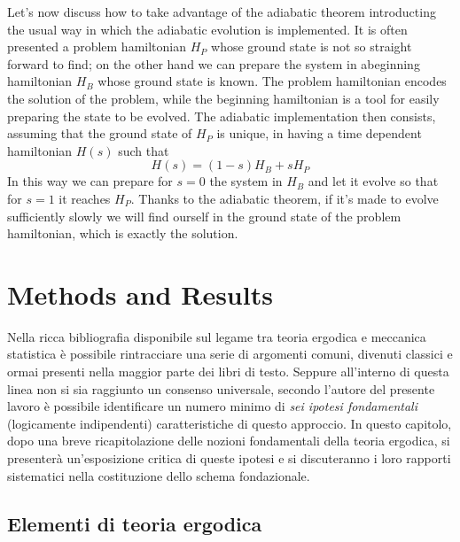 \documentclass[11pt, twoside]{report}
\begin{document}
Let's now discuss how to take advantage of the adiabatic theorem introducting the usual way in which the adiabatic evolution is implemented. It is often presented a problem hamiltonian $H_P$ whose ground state is not so straight forward to find; on the other hand we can prepare the system in abeginning hamiltonian $H_B$ whose ground state is known. The problem hamiltonian encodes the solution of the problem, while the beginning hamiltonian is a tool for easily preparing the state to be evolved. The adiabatic implementation then consists, assuming that the ground state of $H_P$ is unique, in having a time dependent hamiltonian $H(s)$ such that
\begin{equation}
    H(s) = (1-s)H_B + s H_P
\end{equation}
In this way we can prepare for $s=0$ the system in $H_B$ and let it evolve so that for $s=1$ it reaches $H_P$. Thanks to the adiabatic theorem, if it's made to evolve sufficiently slowly we will find ourself in the ground state of the problem hamiltonian, which is exactly the solution.



\newpage 
\thispagestyle{empty}
\chapter{Methods and Results}

Nella ricca bibliografia disponibile sul legame tra teoria ergodica e meccanica statistica è possibile rintracciare una serie di argomenti comuni, divenuti classici e ormai presenti nella maggior parte dei libri di testo. Seppure all'interno di questa linea non si sia raggiunto un consenso universale, secondo l'autore del presente lavoro è possibile identificare un numero minimo di \textit{sei ipotesi fondamentali} (logicamente indipendenti) caratteristiche di questo approccio. In questo capitolo, dopo una breve ricapitolazione delle nozioni fondamentali della teoria ergodica, si presenterà un'esposizione critica di queste ipotesi e si discuteranno i loro rapporti sistematici nella costituzione dello schema fondazionale. 

\section{Elementi di teoria ergodica}


\newpage
\end{document}
